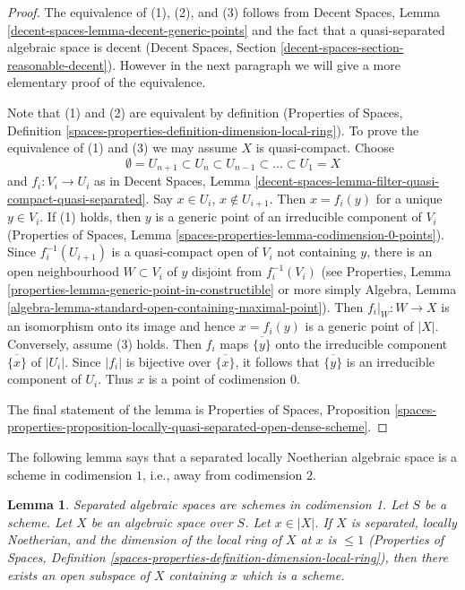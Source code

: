 \documentclass{stacks-project}
\newenvironment{slogan}{\comment}{\endcomment}
\theoremstyle{plain}
\newtheorem{lemma}[subsection]{Lemma}
\theoremstyle{definition}
\theoremstyle{remark}
\numberwithin{equation}{subsection}
\begin{document}
\begin{proof}
The equivalence of (1), (2), and (3) follows from
Decent Spaces, Lemma \ref{decent-spaces-lemma-decent-generic-points}
and the fact that a quasi-separated algebraic space is decent
(Decent Spaces, Section \ref{decent-spaces-section-reasonable-decent}).
However in the next paragraph we will give a more elementary proof of the
equivalence.

\medskip\noindent
Note that (1) and (2) are equivalent by definition
(Properties of Spaces, Definition
\ref{spaces-properties-definition-dimension-local-ring}).
To prove the equivalence of (1) and (3) we may assume $X$ is quasi-compact.
Choose
$$
\emptyset = U_{n + 1} \subset
U_n \subset U_{n - 1} \subset \ldots \subset U_1 = X
$$
and $f_i : V_i \to U_i$ as in Decent Spaces, Lemma
\ref{decent-spaces-lemma-filter-quasi-compact-quasi-separated}.
Say $x \in U_i$, $x \not \in U_{i + 1}$. Then $x = f_i(y)$ for
a unique $y \in V_i$. If (1) holds, then $y$ is a generic point of
an irreducible component of $V_i$ (Properties of Spaces, Lemma
\ref{spaces-properties-lemma-codimension-0-points}).
Since $f_i^{-1}(U_{i + 1})$ is a quasi-compact open of $V_i$
not containing $y$, there is an open neighbourhood $W \subset V_i$
of $y$ disjoint from $f_i^{-1}(V_i)$
(see
Properties, Lemma \ref{properties-lemma-generic-point-in-constructible}
or more simply Algebra, Lemma
\ref{algebra-lemma-standard-open-containing-maximal-point}).
Then $f_i|_W : W \to X$ is an isomorphism onto its image and hence
$x = f_i(y)$ is a generic point of $|X|$. Conversely, assume (3) holds.
Then $f_i$ maps $\overline{\{y\}}$ onto the irreducible component
$\overline{\{x\}}$ of $|U_i|$. Since $|f_i|$ is bijective over
$\overline{\{x\}}$, it follows that $\overline{\{y\}}$
is an irreducible component of $U_i$. Thus $x$ is a point of
codimension $0$.

\medskip\noindent
The final statement of the lemma is
Properties of Spaces, Proposition
\ref{spaces-properties-proposition-locally-quasi-separated-open-dense-scheme}.
\end{proof}

\noindent
The following lemma says that a separated locally Noetherian algebraic
space is a scheme in codimension $1$, i.e., away from codimension $2$.

\begin{lemma}
\label{lemma-codim-1-point-in-schematic-locus}
\begin{slogan}
Separated algebraic spaces are schemes in codimension 1.
\end{slogan}
Let $S$ be a scheme. Let $X$ be an algebraic space over $S$.
Let $x \in |X|$. If $X$ is separated, locally Noetherian, and
the dimension of the local ring of $X$ at $x$ is $\leq 1$
(Properties of Spaces, Definition
\ref{spaces-properties-definition-dimension-local-ring}),
then there exists an open subspace of $X$ containing $x$ which is a scheme.
\end{lemma}
\end{document}
